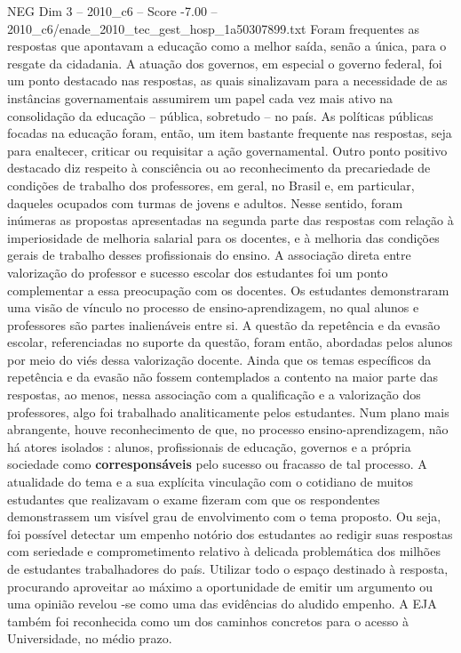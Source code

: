 \begin{textsample}{NEG Dim 3 – 2010\_c6 – Score -7.00 – 2010\_c6/enade\_2010\_tec\_gest\_hosp\_1a50307899.txt}
Foram frequentes as respostas que apontavam a educação como a melhor saída, senão a única, para o resgate da cidadania.
A atuação dos governos, em especial o governo federal, foi um ponto destacado nas respostas, as quais sinalizavam para a necessidade de as instâncias governamentais assumirem um papel cada vez mais ativo na consolidação da educação – pública, sobretudo – no país.
As políticas públicas focadas na educação foram, então, um item bastante frequente nas respostas, seja para enaltecer, criticar ou requisitar a ação governamental.
Outro ponto positivo destacado diz respeito à consciência ou ao reconhecimento da precariedade de condições de trabalho dos professores, em geral, no Brasil e, em particular, daqueles ocupados com turmas de jovens e adultos.
Nesse sentido, foram inúmeras as propostas apresentadas na segunda parte das respostas com relação à imperiosidade de melhoria salarial para os docentes, e à melhoria das condições gerais de trabalho desses profissionais do ensino.
A associação direta entre valorização do professor e sucesso escolar dos estudantes foi um ponto complementar a essa preocupação com os docentes.
Os estudantes demonstraram uma visão de vínculo no processo de ensino-aprendizagem, no qual alunos e professores são partes inalienáveis entre si.
A questão da repetência e da evasão escolar, referenciadas no suporte da questão, foram então, abordadas pelos alunos por meio do viés dessa valorização docente.
Ainda que os temas específicos da repetência e da evasão não fossem contemplados a contento na maior parte das respostas, ao menos, nessa associação com a qualificação e a valorização dos professores, algo foi trabalhado analiticamente pelos estudantes.
Num plano mais abrangente, houve reconhecimento de que, no processo ensino-aprendizagem, não há atores isolados : alunos, profissionais de educação, governos e a própria sociedade como \textbf{corresponsáveis} pelo sucesso ou fracasso de tal processo.
A atualidade do tema e a sua explícita vinculação com o cotidiano de muitos estudantes que realizavam o exame fizeram com que os respondentes demonstrassem um visível grau de envolvimento com o tema proposto.
Ou seja, foi possível detectar um empenho notório dos estudantes ao redigir suas respostas com seriedade e comprometimento relativo à delicada problemática dos milhões de estudantes trabalhadores do país.
Utilizar todo o espaço destinado à resposta, procurando aproveitar ao máximo a oportunidade de emitir um argumento ou uma opinião revelou -se como uma das evidências do aludido empenho.
A EJA também foi reconhecida como um dos caminhos concretos para o acesso à Universidade, no médio prazo.

\end{textsample}
